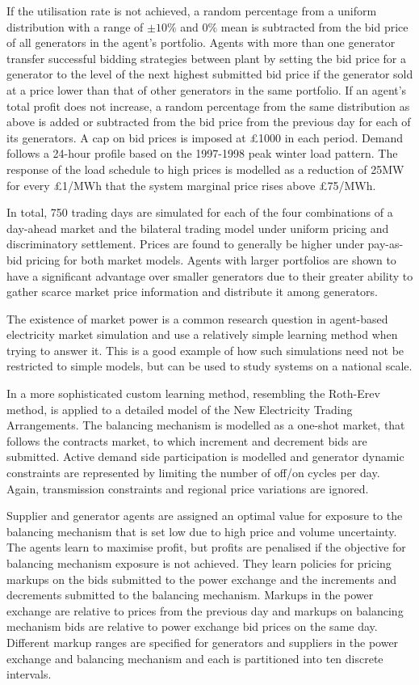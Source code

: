 If the utilisation rate is not achieved, a random percentage from a uniform
distribution with a range of $\pm10\%$ and $0\%$ mean is subtracted from the bid
price of all generators in the agent's portfolio.  Agents with more than one
generator transfer successful bidding strategies between plant by setting the
bid price for a generator to the level of the next highest submitted bid price
if the generator sold at a price lower than that of other generators in the same
portfolio.  If an agent's total profit does not increase, a random percentage
from the same distribution as above is added or subtracted from the bid price
from the previous day for each of its generators.  A cap on bid prices is
imposed at \pounds1000 in each period.  Demand follows a 24-hour profile based
on the 1997-1998 peak winter load pattern.  The response of the load schedule to
high prices is modelled as a reduction of 25MW for every \pounds1/MWh that the
system marginal price rises above \pounds75/MWh.

In total, 750 trading days are simulated for each of the four combinations of a
day-ahead market and the bilateral trading model under uniform pricing and
discriminatory settlement.  Prices are found to generally be higher under
pay-as-bid pricing for both market models.  Agents with larger portfolios are
shown to have a significant advantage over smaller generators due to their
greater ability to gather scarce market price information and distribute it
among generators.

The existence of market power is a common research question in agent-based
electricity market simulation and  use a relatively simple
learning method when trying to answer it.  This is a good example of how such
simulations need not be restricted to simple models, but can be used to study
systems on a national scale.

In  a more sophisticated custom learning method, resembling
the Roth-Erev method, is applied to a detailed model of the New Electricity
Trading Arrangements.  The balancing mechanism is modelled as a one-shot market,
that follows the contracts market, to which increment and decrement bids are
submitted.  Active demand side participation is modelled and generator dynamic
constraints are represented by limiting the number of off/on cycles per day.
Again, transmission constraints and regional price variations are ignored.

Supplier and generator agents are assigned an optimal value for exposure to the
balancing mechanism that is set low due to high price and volume uncertainty.
The agents learn to maximise profit, but profits are penalised if the objective
for balancing mechanism exposure is not achieved.  They learn policies for
pricing markups on the bids submitted to the power exchange and the increments
and decrements submitted to the balancing mechanism.  Markups in the power
exchange are relative to prices from the previous day and markups on balancing
mechanism bids are relative to power exchange bid prices on the same day.
Different markup ranges are specified for generators and suppliers in the power
exchange and balancing mechanism and each is partitioned into ten discrete
intervals.

